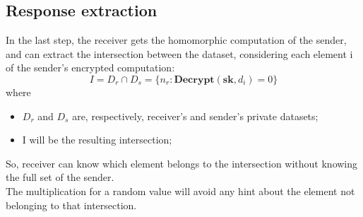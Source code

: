 \documentclass[10pt]{extarticle}
\begin{document}
\subsection{Response extraction}
In the last step, the receiver gets the homomorphic computation of the sender, and can extract the intersection between the dataset, considering each element i of the sender's encrypted computation:
\begin{equation}
    I = D_r \cap D_s = \{n_r: \textbf{Decrypt}(\textbf{sk}, d_i) = 0\}
\end{equation}
where 
\begin{itemize}
	\item $D_r$ and $D_s$ are, respectively, receiver's and sender's private datasets;
	\item I will be the resulting intersection;
\end{itemize}
So, receiver can know which element belongs to the intersection without knowing the full set of the sender.\\
The multiplication for a random value will avoid any hint about the element not belonging to that intersection.
\end{document}
